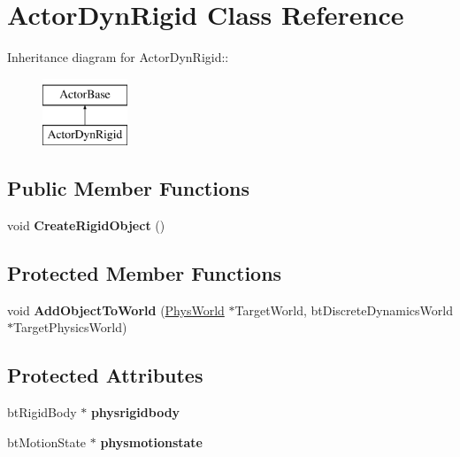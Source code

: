 \hypertarget{classActorDynRigid}{
\section{ActorDynRigid Class Reference}
\label{d4/d0e/classActorDynRigid}
}
Inheritance diagram for ActorDynRigid::\begin{figure}[H]
\begin{center}
\leavevmode
\includegraphics[height=2cm]{d4/d0e/classActorDynRigid}
\end{center}
\end{figure}
\subsection*{Public Member Functions}
\begin{DoxyCompactItemize}
\item 
\hypertarget{classActorDynRigid_aa537dd154a64e34d5c08f660affc4300}{
void {\bfseries CreateRigidObject} ()}
\label{d4/d0e/classActorDynRigid_aa537dd154a64e34d5c08f660affc4300}

\end{DoxyCompactItemize}
\subsection*{Protected Member Functions}
\begin{DoxyCompactItemize}
\item 
\hypertarget{classActorDynRigid_ad598729bca37f568a312b8f7a08ce68c}{
void {\bfseries AddObjectToWorld} (\hyperlink{classPhysWorld}{PhysWorld} $\ast$TargetWorld, btDiscreteDynamicsWorld $\ast$TargetPhysicsWorld)}
\label{d4/d0e/classActorDynRigid_ad598729bca37f568a312b8f7a08ce68c}

\end{DoxyCompactItemize}
\subsection*{Protected Attributes}
\begin{DoxyCompactItemize}
\item 
\hypertarget{classActorDynRigid_a83a6cb758304431043c6bfa05b47ecb2}{
btRigidBody $\ast$ {\bfseries physrigidbody}}
\label{d4/d0e/classActorDynRigid_a83a6cb758304431043c6bfa05b47ecb2}

\item 
\hypertarget{classActorDynRigid_a25c39b4f28cb2516511838a66f6eb3d8}{
btMotionState $\ast$ {\bfseries physmotionstate}}
\label{d4/d0e/classActorDynRigid_a25c39b4f28cb2516511838a66f6eb3d8}

\end{DoxyCompactItemize}


